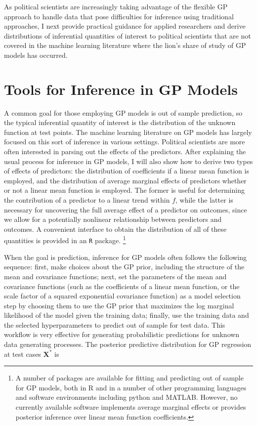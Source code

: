 \documentclass{draft}
\begin{document}
As political scientists are increasingly taking advantage of the flexible GP approach to handle data
that pose difficulties for inference using traditional approaches,
I next provide practical guidance for applied researchers
and derive distributions of inferential quantities of interest to political scientists
that are not covered in the machine learning literature where the lion's share of study of GP models has occurred.


\section{Tools for Inference in GP Models}
\label{sec:methods}

A common goal for those employing GP models is out of sample prediction,
so the typical inferential quantity of interest is the distribution of the unknown function at test points.
The machine learning literature on GP models has largely focused on this sort of inference in various settings.
Political scientists are more often interested in parsing out the effects of the predictors.
After explaining the usual process for inference in GP models,
I will also show how to derive two types of effects of predictors:
the distribution of coefficients if a linear mean function is employed,
and the distribution of average marginal effects of predictors whether or not a linear mean function is employed.
The former is useful for determining the contribution of a predictor to a linear trend within \( f \),
while the latter is necessary for uncovering the full average effect of a predictor on outcomes,
since we allow for a potentially nonlinear relationship between predictors and outcomes.
A convenient interface to obtain the distribution of all of these quantities is provided in an \texttt{R} package.%
\footnote{
    A number of packages are available for fitting and predicting out of sample for GP models,
    both in R and in a number of other programming languages and software environments including python and MATLAB.
    However, no currently available software implements average marginal effects
    or provides posterior inference over linear mean function coefficients.
}

When the goal is prediction, inference for GP models often follows the following sequence:
first, make choices about the GP prior, including the structure of the mean and covariance functions;
next, set the parameters of the mean and covariance functions
(such as the coefficients of a linear mean function, or the scale factor of a squared exponential covariance function)
as a model selection step by choosing them to use the GP prior that maximizes
the log marginal likelihood of the model given the training data;
finally, use the training data and the selected hyperparameters to predict out of sample for test data.
This workflow is very effective for generating probabilistic predictions for unknown data generating processes.
The posterior predictive distribution for GP regression at test cases \( \mathbf{X}^\ast \) is
\end{document}
